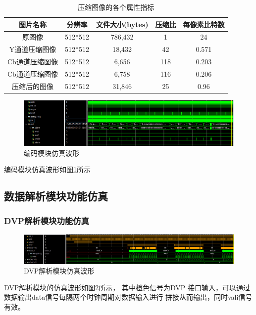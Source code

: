 \documentclass{article}
\numberwithin {equation}{section}
\begin{document}
\begin{spacing}{1.25}
  \begin{table}[H]
    \caption{压缩图像的各个属性指标}
    \label{image vs}
    \centering
    \begin{tabular}{ccccc}
      \toprule
      图片名称 & 分辨率 & 文件大小(bytes) & 压缩比 & 每像素比特数\\
      \midrule
      原图像 & 512*512 & 786,432 & 1 & 24\\
      Y通道压缩图像 & 512*512 & 18,432 & 42 & 0.571\\
      Cb通道压缩图像 & 512*512 & 6,656 & 118 & 0.203\\
      Cb通道压缩图像 & 512*512 & 6,758 & 116 & 0.206\\
      压缩后的图像 & 512*512 & 31,846 & 25 & 0.96\\
      \bottomrule
    \end{tabular}
  \end{table}
  \begin{figure}[H]
    \centering
    \includegraphics[scale=0.30]{./pictures/top_wave.png}
    \caption{编码模块仿真波形}
    \label{top_wave}
  \end{figure}
  编码模块仿真波形如图\ref{top_wave}所示
  \subsection{数据解析模块功能仿真}
    \vspace{1em}
    \subsubsection{DVP解析模块功能仿真}
      \vspace{1em}
      \begin{figure}[H]
        \centering
        \includegraphics[scale=0.25]{./pictures/DVP_simwave.png}
        \caption{DVP解析模块仿真波形}
        \label{DVPSimWave}
      \end{figure}
      DVP解析模块的仿真波形如图\ref{DVPSimWave}所示， 其中橙色信号为DVP
      接口输入，可以通过数据输出data信号每隔两个时钟周期对数据输入进行
      拼接从而输出，同时vali信号有效。

\end{spacing}
\end{document}
